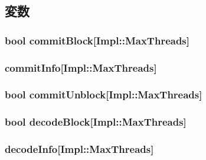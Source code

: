 \subsection{変数}
\hypertarget{structTimeBufStruct_a5c4d4f5745c9950cd14ce633faea7f29}{
\subsubsection[{commitBlock}]{\setlength{\rightskip}{0pt plus 5cm}bool {\bf commitBlock}\mbox{[}Impl::MaxThreads\mbox{]}}}
\label{structTimeBufStruct_a5c4d4f5745c9950cd14ce633faea7f29}
\hypertarget{structTimeBufStruct_a00017f06df3e141cb5a9ab5bb64b9bae}{
\subsubsection[{commitInfo}]{ {\bf commitInfo}\mbox{[}Impl::MaxThreads\mbox{]}}}
\label{structTimeBufStruct_a00017f06df3e141cb5a9ab5bb64b9bae}
\hypertarget{structTimeBufStruct_ac417d2ad64fda7b8f055e9d9ab040d95}{
\subsubsection[{commitUnblock}]{\setlength{\rightskip}{0pt plus 5cm}bool {\bf commitUnblock}\mbox{[}Impl::MaxThreads\mbox{]}}}
\label{structTimeBufStruct_ac417d2ad64fda7b8f055e9d9ab040d95}
\hypertarget{structTimeBufStruct_a37fbecdc2160421c24f03815d6c5fbf0}{
\subsubsection[{decodeBlock}]{\setlength{\rightskip}{0pt plus 5cm}bool {\bf decodeBlock}\mbox{[}Impl::MaxThreads\mbox{]}}}
\label{structTimeBufStruct_a37fbecdc2160421c24f03815d6c5fbf0}
\hypertarget{structTimeBufStruct_af215dd191ecd9a4b7e5635285704690a}{
\subsubsection[{decodeInfo}]{ {\bf decodeInfo}\mbox{[}Impl::MaxThreads\mbox{]}}}
